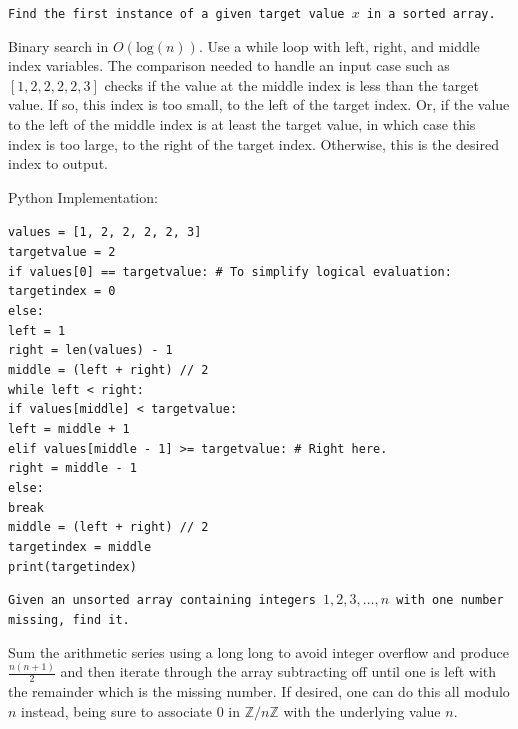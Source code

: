 \texttt{Find the first instance of a given target value $x$ in a sorted array.}

Binary search in $O(\text{log}(n))$. Use a while loop with left, right, and middle index variables. The comparison needed to handle an input case such as $[1,2,2,2,2,3]$ checks if the value at the middle index is less than the target value. If so, this index is too small, to the left of the target index. Or, if the value to the left of the middle index is at least the target value, in which case this index is too large, to the right of the target index. Otherwise, this is the desired index to output.

Python Implementation:

\texttt{values = [1, 2, 2, 2, 2, 3]} \\
\texttt{targetvalue = 2} \\
\texttt{if values[0] == targetvalue: \# To simplify logical evaluation:} \\
\phantom{xxxx}\texttt{targetindex = 0} \\
\texttt{else:} \\
\phantom{xxxx}\texttt{left = 1} \\
\phantom{xxxx}\texttt{right = len(values) - 1} \\
\phantom{xxxx}\texttt{middle = (left + right) // 2} \\
\phantom{xxxx}\texttt{while left < right:} \\
\phantom{xxxxxxxx}\texttt{if values[middle] < targetvalue:} \\
\phantom{xxxxxxxxxxxx}\texttt{left = middle + 1} \\
\phantom{xxxxxxxx}\texttt{elif values[middle - 1] >= targetvalue: \# Right here.} \\
\phantom{xxxxxxxxxxxx}\texttt{right = middle - 1} \\
\phantom{xxxxxxxx}\texttt{else:} \\
\phantom{xxxxxxxxxxxx}\texttt{break} \\
\phantom{xxxxxxxx}\texttt{middle = (left + right) // 2} \\
\phantom{xxxx}\texttt{targetindex = middle} \\
\texttt{print(targetindex)}

\texttt{Given an unsorted array containing integers $1,2,3,\dots,n$ with one number missing, find it.}

Sum the arithmetic series using a long long to avoid integer overflow and produce $\frac{n(n+1)}{2}$ and then iterate through the array subtracting off until one is left with the remainder which is the missing number. If desired, one can do this all modulo $n$ instead, being sure to associate $0$ in $\mathbb{Z}/n\mathbb{Z}$ with the underlying value $n$.

